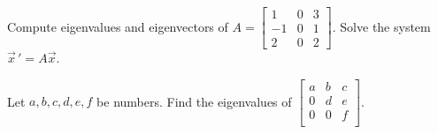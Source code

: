 \begin{exercise}\ansMark%
\leavevmode
\begin{tasks}
\task
Compute eigenvalues and eigenvectors of
$A= \left[ \begin{smallmatrix}
1 & 0 & 3 \\
-1 & 0 & 1 \\
2 & 0 & 2
\end{smallmatrix}\right]$.
\task
Solve the system
$\vec{x}\,' = A \vec{x}$.
\end{tasks}
\end{exercise}

\begin{exercise}
Let $a,b,c,d,e,f$ be numbers.  Find the eigenvalues of
$\left[ \begin{smallmatrix}
a & b & c \\
0 & d & e \\
0 & 0 & f \\
\end{smallmatrix} \right]$.
\end{exercise}

